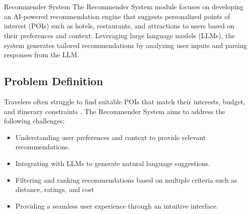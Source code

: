\chapter{}{Recommender System}
\label{chap:recommender-system}
The Recommender System module focuses on developing an AI-powered recommendation engine that suggests personalized points of interest (POIs) such as hotels, restaurants, and attractions to users based on their preferences and context. Leveraging large language models (LLMs), the system generates tailored recommendations by analyzing user inputs and parsing responses from the LLM.

\section{Problem Definition}
Travelers often struggle to find suitable POIs that match their interests, budget, and itinerary constraints
. The Recommender System aims to address the following challenges:
\begin{itemize}
    \item Understanding user preferences and context to provide relevant recommendations.
    \item Integrating with LLMs to generate natural language suggestions.
    \item Filtering and ranking recommendations based on multiple criteria such as distance, ratings, and cost
    \item Providing a seamless user experience through an intuitive interface.
\end{itemize}

